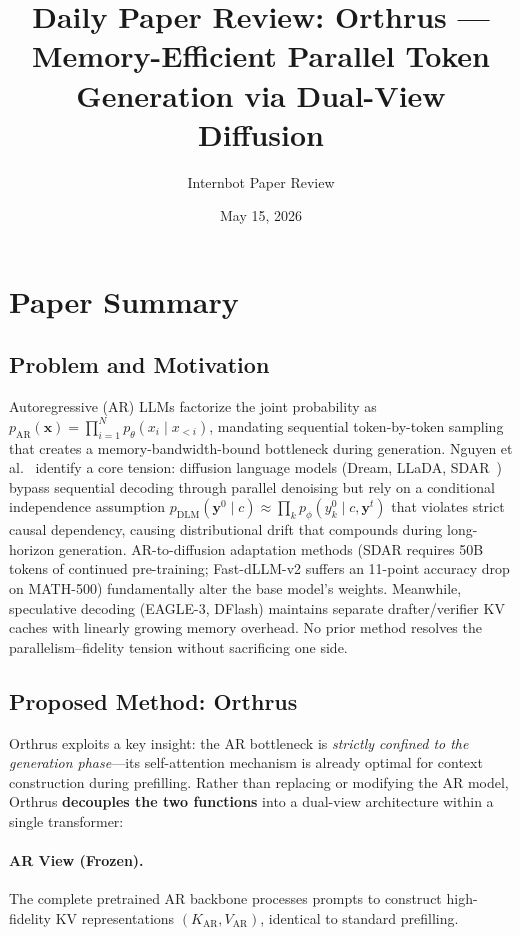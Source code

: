 \documentclass[11pt,a4paper]{article}
\title{Daily Paper Review: Orthrus --- Memory-Efficient Parallel Token Generation via Dual-View Diffusion}
\author{Internbot Paper Review}
\date{May 15, 2026}
\begin{document}
\maketitle

\section{Paper Summary}

\subsection{Problem and Motivation}

Autoregressive (AR) LLMs factorize the joint probability as $p_{\mathrm{AR}}(\mathbf{x}) = \prod_{i=1}^{N} p_\theta(x_i \mid x_{<i})$, mandating sequential token-by-token sampling that creates a memory-bandwidth-bound bottleneck during generation. Nguyen et al.~\cite{orthrus} identify a core tension: diffusion language models (Dream, LLaDA, SDAR~\cite{sdar}) bypass sequential decoding through parallel denoising but rely on a conditional independence assumption $p_{\mathrm{DLM}}(\mathbf{y}^0 \mid c) \approx \prod_{k} p_\phi(y_k^0 \mid c, \mathbf{y}^t)$ that violates strict causal dependency, causing distributional drift that compounds during long-horizon generation. AR-to-diffusion adaptation methods (SDAR requires 50B tokens of continued pre-training; Fast-dLLM-v2 suffers an 11-point accuracy drop on MATH-500) fundamentally alter the base model's weights. Meanwhile, speculative decoding (EAGLE-3, DFlash) maintains separate drafter/verifier KV caches with linearly growing memory overhead. No prior method resolves the parallelism--fidelity tension without sacrificing one side.

\subsection{Proposed Method: Orthrus}

Orthrus exploits a key insight: the AR bottleneck is \textit{strictly confined to the generation phase}---its self-attention mechanism is already optimal for context construction during prefilling. Rather than replacing or modifying the AR model, Orthrus \textbf{decouples the two functions} into a dual-view architecture within a single transformer:

\paragraph{AR View (Frozen).} The complete pretrained AR backbone processes prompts to construct high-fidelity KV representations $(K_{\mathrm{AR}}, V_{\mathrm{AR}})$, identical to standard prefilling.
\end{document}
